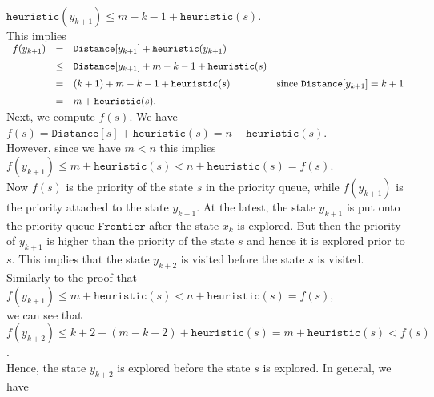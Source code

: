 \\[0.2cm]
\hspace*{1.3cm}
$\texttt{heuristic}(y_{k+1}) \leq m - k - 1 + \texttt{heuristic}(s)$.
\\[0.2cm]
This implies
\\[0.2cm]
\hspace*{1.3cm}
$
\begin{array}[t]{lcll} 
f(y_{k+1}) & =  & \texttt{Distance}[y_{k+1}] + \texttt{heuristic}(y_{k+1})     \\[0.2cm]
          &\leq& \texttt{Distance}[y_{k+1}] + m-k-1 + \texttt{heuristic}(s) \\[0.2cm]
          & =  & (k+1) + m-k-1 + \texttt{heuristic}(s) 
               & \mbox{since $\texttt{Distance}[y_{k+1}] = k+1$} \\[0.2cm]
          & =  & m + \texttt{heuristic}(s). 
\end{array}
$
\\[0.2cm]
Next, we compute $f(s)$.  We have
\\[0.2cm]
\hspace*{1.3cm}
$f(s) = \texttt{Distance}[s] + \texttt{heuristic}(s) = n + \texttt{heuristic}(s)$.
\\[0.2cm]
However, since we have $m < n$ this implies
\\[0.2cm]
\hspace*{1.3cm}
$f(y_{k+1}) \leq m + \texttt{heuristic}(s) < n + \mathtt{heuristic}(s) = f(s)$.
\\[0.2cm]
Now $f(s)$ is the priority of the state $s$ in the priority queue, while $f(y_{k+1})$ is the priority
attached to the state $y_{k+1}$.  At the latest,  the state $y_{k+1}$ is put onto the priority queue $\texttt{Frontier}$
after the state $x_k$ is explored.  But then the priority of $y_{k+1}$ is higher than the priority
of the state $s$ and hence it is explored prior to $s$.  This implies that the state
$y_{k+2}$ is visited before the state $s$ is visited.  Similarly to the proof that 
\\[0.2cm]
\hspace*{1.3cm}
$f(y_{k+1}) \leq m + \texttt{heuristic}(s) < n + \texttt{heuristic}(s) = f(s)$, 
\\[0.2cm]
we can see that 
\\[0.2cm]
\hspace*{1.3cm}
$f(y_{k+2}) \leq k+2 + (m-k-2) + \texttt{heuristic}(s) = m + \texttt{heuristic}(s) < f(s)$.
\\[0.2cm]
Hence, the state $y_{k+2}$ is explored before the state $s$ is explored.  In general, we have 
